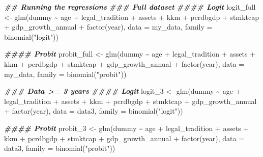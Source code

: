 \documentclass[a4paper,nobind]{templates/ociamthesis}
\newenvironment{Shaded}{\begin{snugshade}}{\end{snugshade}}
\newcommand{\AttributeTok}[1]{\textcolor[rgb]{0.77,0.63,0.00}{#1}}
\newcommand{\DocumentationTok}[1]{\textcolor[rgb]{0.56,0.35,0.01}{\textbf{\textit{#1}}}}
\newcommand{\FunctionTok}[1]{\textcolor[rgb]{0.00,0.00,0.00}{#1}}
\newcommand{\NormalTok}[1]{#1}
\newcommand{\OtherTok}[1]{\textcolor[rgb]{0.56,0.35,0.01}{#1}}
\newcommand{\SpecialCharTok}[1]{\textcolor[rgb]{0.00,0.00,0.00}{#1}}
\newcommand{\StringTok}[1]{\textcolor[rgb]{0.31,0.60,0.02}{#1}}
\renewenvironment{Shaded}
{
  \vspace{10pt}%
  \begin{snugshade}%
}{%
  \end{snugshade}%
  \vspace{8pt}%
}
\begin{document}
\begin{Shaded}
\begin{Highlighting}[]
\DocumentationTok{\#\# Running the regressions }
\DocumentationTok{\#\#\# Full dataset}
\DocumentationTok{\#\#\#\# Logit}
\NormalTok{logit\_full }\OtherTok{\textless{}{-}} \FunctionTok{glm}\NormalTok{(dummy }\SpecialCharTok{\textasciitilde{}}\NormalTok{ age }\SpecialCharTok{+}\NormalTok{ legal\_tradition }\SpecialCharTok{+} 
\NormalTok{       assets }\SpecialCharTok{+}\NormalTok{ kkm }\SpecialCharTok{+} 
\NormalTok{       pcrdbgdp }\SpecialCharTok{+}\NormalTok{ stmktcap }\SpecialCharTok{+}\NormalTok{ gdp\_growth\_annual }\SpecialCharTok{+} 
       \FunctionTok{factor}\NormalTok{(year), }\AttributeTok{data =}\NormalTok{ my\_data, }
       \AttributeTok{family =} \FunctionTok{binomial}\NormalTok{(}\StringTok{"logit"}\NormalTok{))}

\DocumentationTok{\#\#\#\# Probit}
\NormalTok{probit\_full }\OtherTok{\textless{}{-}} \FunctionTok{glm}\NormalTok{(dummy }\SpecialCharTok{\textasciitilde{}}\NormalTok{ age }\SpecialCharTok{+}\NormalTok{ legal\_tradition }\SpecialCharTok{+} 
\NormalTok{       assets }\SpecialCharTok{+}\NormalTok{ kkm }\SpecialCharTok{+} 
\NormalTok{       pcrdbgdp }\SpecialCharTok{+}\NormalTok{ stmktcap }\SpecialCharTok{+}\NormalTok{ gdp\_growth\_annual }\SpecialCharTok{+} 
       \FunctionTok{factor}\NormalTok{(year), }\AttributeTok{data =}\NormalTok{ my\_data,}
       \AttributeTok{family =} \FunctionTok{binomial}\NormalTok{(}\StringTok{"probit"}\NormalTok{))}

\DocumentationTok{\#\#\# Data \textgreater{}= 3 years}
\DocumentationTok{\#\#\#\# Logit}
\NormalTok{logit\_3 }\OtherTok{\textless{}{-}} \FunctionTok{glm}\NormalTok{(dummy }\SpecialCharTok{\textasciitilde{}}\NormalTok{ age }\SpecialCharTok{+}\NormalTok{ legal\_tradition }\SpecialCharTok{+} 
\NormalTok{       assets }\SpecialCharTok{+}\NormalTok{ kkm }\SpecialCharTok{+} 
\NormalTok{       pcrdbgdp }\SpecialCharTok{+}\NormalTok{ stmktcap }\SpecialCharTok{+}\NormalTok{ gdp\_growth\_annual }\SpecialCharTok{+} 
       \FunctionTok{factor}\NormalTok{(year), }\AttributeTok{data =}\NormalTok{ data3,}
       \AttributeTok{family =} \FunctionTok{binomial}\NormalTok{(}\StringTok{"logit"}\NormalTok{))}

\DocumentationTok{\#\#\#\# Probit}
\NormalTok{probit\_3 }\OtherTok{\textless{}{-}} \FunctionTok{glm}\NormalTok{(dummy }\SpecialCharTok{\textasciitilde{}}\NormalTok{ age }\SpecialCharTok{+}\NormalTok{ legal\_tradition }\SpecialCharTok{+} 
\NormalTok{       assets }\SpecialCharTok{+}\NormalTok{ kkm }\SpecialCharTok{+} 
\NormalTok{       pcrdbgdp }\SpecialCharTok{+}\NormalTok{ stmktcap }\SpecialCharTok{+}\NormalTok{ gdp\_growth\_annual }\SpecialCharTok{+} 
       \FunctionTok{factor}\NormalTok{(year), }\AttributeTok{data =}\NormalTok{ data3,}
       \AttributeTok{family =} \FunctionTok{binomial}\NormalTok{(}\StringTok{"probit"}\NormalTok{))}


\end{Highlighting}
\end{Shaded}
\end{document}
